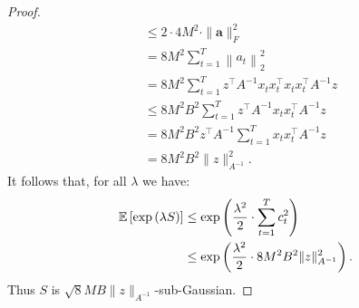 \begin{proof}
\begin{align*}
    &\leq 2 \cdot4M^2 \cdot   \| \mathbf{a}\|_F^2\\
    &= 8M^2 \sum_{t=1}^{T}\left\|a_t\right\|_2^2 \\
    &= 8M^2 \sum_{t=1}^{T} z^\top A^{-1}x_tx_t^\top x_tx_t^\top A^{-1}z \\
    &\leq 8M^2B^2 \sum_{t=1}^{T} z^\top A^{-1}x_tx_t^\top A^{-1}z \\
    &= 8M^2B^2  z^\top A^{-1}\sum_{t=1}^{T}x_tx_t^\top  A^{-1}z \\
    &= 8M^2B^2 \|z\|_{A^{-1}}^2.
\end{align*}
It follows that, for all $\lambda$ we have: 
\begin{align*}
        \mathbb{E}\left[\exp\left(\lambda S\right)\right] &\leq \exp\left(\frac{\lambda^2}{2} \cdot  \sum_{t=1}^T c_{t}^2\right) \\
        &\leq \exp\left(\frac{\lambda^2}{2} \cdot  8M^2B^2\|z\|_{A^{-1}}^2\right).
    \end{align*}
Thus $S$ is $\sqrt{8}MB\|z\|_{A^{-1}}$-sub-Gaussian.
\end{proof}










